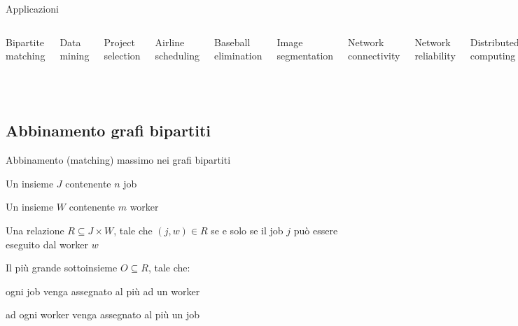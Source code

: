 \begin{frame}{Applicazioni}

\vspace{-9pt}
\begin{columns}[T]
\BIL
\item Bipartite matching
\item Data mining
\item Project selection
\item Airline scheduling
\item Baseball elimination
\item Image segmentation
\item Network connectivity
\EIL
{}
\BIL
\item Network reliability
\item Distributed computing
\item Egalitarian stable matching
\item Security of statistical data
\item Network intrusion detection
\item Multi-camera scene reconstruction
\item Gene function prediction
\EIL
\end{columns}

\medskip
{}


\end{frame}

\subsection{Abbinamento grafi bipartiti}

\begin{frame}{Abbinamento (matching) massimo nei grafi bipartiti}

\vspace{-9pt}
\begin{myboxtitle}
\BIL
\item Un insieme $J$ contenente $n$ job
\item Un insieme $W$ contenente $m$ worker
\item Una relazione $R \subseteq J \times W$, tale che $(j,w) \in R$
se e solo se il job $j$ può essere eseguito dal worker $w$
\EIL
\end{myboxtitle}

\begin{myboxtitle}
\BIL
\item Il più grande sottoinsieme $O \subseteq R$, tale che:
  \BI
  \item ogni job venga assegnato al più ad un worker
  \item ad ogni worker venga assegnato al più un job
  \EI
\EIL
\end{myboxtitle}

\end{frame}
  
